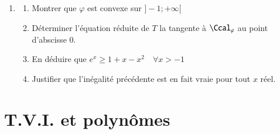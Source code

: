 \documentclass[oneside,12pt]{article}
\let\oldsection\section
\renewcommand{\section}{\newpage\oldsection}
\begin{document}
\begin{enumerate}
    \begin{center}
    \end{center}
    \item \begin{enumerate}
        \item Montrer que $\varphi$ est convexe sur $]-1;+\infty[$
        \item Déterminer l'équation réduite de $T$ la tangente à $\Ccal_\varphi$ au point d'abscisse 0.
        \item En déduire que $e^x\geq1+x-x^2 \quad \forall x>-1$
        \item Justifier que l'inégalité précédente est en fait vraie pour tout $x$ réel.
    \end{enumerate} 
\end{enumerate}





\section{T.V.I. et polynômes}
\end{document}
